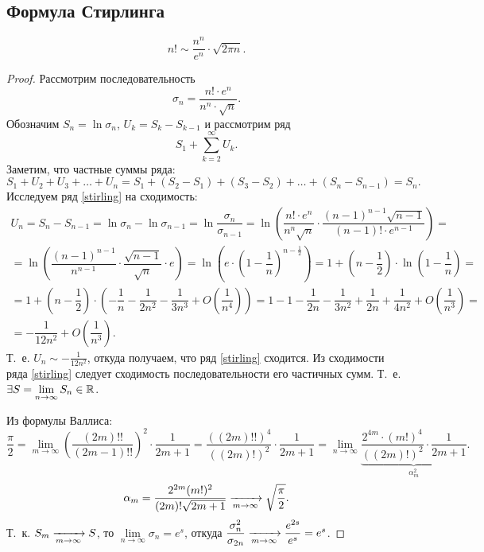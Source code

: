 \documentclass[../../main.tex]{subfiles}
\begin{document}
\subsection{Формула Стирлинга}
\begin{thm}
\[
n! \sim \dfrac{n^n}{e^n}\cdot\sqrt{2\pi n}.
\]
\end{thm}

\begin{proof}
Рассмотрим последовательность
\[\sigma_n = \dfrac{n! \cdot e^n}{n^n \cdot \sqrt{n}}.\]
Обозначим $ S_n = \ln{\sigma_n}$, $U_k = S_k - S_{k-1}$ и рассмотрим ряд
\begin{equation}
\label{stirling} S_1 + \sum\limits_{k=2}^\infty U_k.
\end{equation}
Заметим, что частные суммы ряда:
\[ 
S_1 + U_2 + U_3 + \ldots + U_n = S_1 + \left(S_2 - S_1\right) + 
\left(S_3 - S_2\right) + \ldots + \left(S_n - S_{n - 1}\right) = S_n.
\]
Исследуем ряд \eqref{stirling} на сходимость:
\begin{gather*}
U_n = S_n - S_{n - 1} = \ln\sigma_n - \ln\sigma_{n - 1} = 
\ln\dfrac{\sigma_n}{\sigma_{n - 1}} = \ln\left(\dfrac{n! \cdot 
e^n}{n^n\sqrt{n}}
\cdot \dfrac{(n - 1)^{n - 1}\sqrt{n - 1}}{(n - 1)! \cdot e^{n -1}}\right) =
\\
= \ln\left(\dfrac{(n - 1)^{n - 1}}{n^{n - 1}} \cdot \dfrac{\sqrt{n - 
1}}{\sqrt{n}}
\cdot e\right) = \ln \left(e\cdot \left(1 - \dfrac{1}{n} \right)^{n - 
\frac{1}{2}}\right) = 
1 + \left(n - \dfrac{1}{2} \right) \cdot\ln \left( 1 - \dfrac{1}{n} \right) =
\\
= 1 + \left( n - \dfrac{1}{2} \right)\cdot\left(-\dfrac{1}{n} - \dfrac{1}{2n^2}
- \dfrac{1}{3n^3} + O\left(\dfrac{1}{n^4} \right) \right) = 
1 - 1 - \dfrac{1}{2n} - \dfrac{1}{3n^2} + \dfrac{1}{2n} + \dfrac{1}{4n^2}
+ O\left( \dfrac{1}{n^3} \right) = 
\\
= -\dfrac{1}{12n^2} + O\left( \dfrac{1}{n^3}\right).
\end{gather*}
Т.~е. $U_n \sim -\frac{1}{12n^2}$, откуда получаем, что ряд \eqref{stirling} 
сходится.
Из сходимости ряда \eqref{stirling} следует сходимость
последовательности его частичных сумм. Т.~е. $ \exists 
S = \lim\limits_{n\to\infty} S_n \in \mathbb{R}$.

Из формулы Валлиса:
\[
\dfrac{\pi}{2} = \lim\limits_{m \to \infty} \left( \dfrac{(2m)!!}{(2m - 1)!!}
\right)^2\cdot \dfrac{1}{2m + 1} = \dfrac{((2m)!!)^4}{((2m)!)^2} \cdot
\dfrac{1}{2m + 1} = \lim\limits_{n \to \infty} 
\underbrace{\dfrac{2^{4m}\cdot(m!)^4}{((2m)!)^2} 
\cdot \dfrac{1}{2m + 1}}_{\alpha_m^2}.
\]
\[
\alpha_m = \dfrac{2^{2m}(m!)^2}{(2m)!\sqrt{2m + 1}} \xrightarrow[m\to\infty]{} 
\sqrt{\dfrac{\pi}{2}}.
\]
Т.~к. $ S_m \xrightarrow[m\to\infty]{} S $, то $ \lim\limits_{n \to \infty} \sigma_n = 
e^s$, откуда 
$\dfrac{\sigma_n^2}{\sigma_{2n}} \xrightarrow[m\to\infty]{}  \dfrac{e^{2s}}{e^s} = e^s 
$.


\end{proof}
\end{document}
